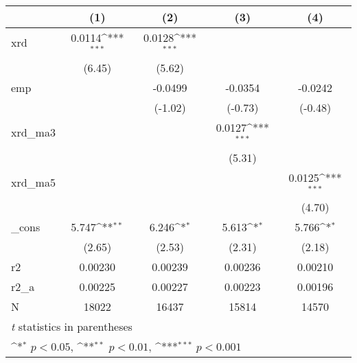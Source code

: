 {
\def\sym#1{\ifmmode^{#1}\else\(^{#1}\)\fi}
\begin{tabular}{l*{4}{c}}
\hline\hline
            &\multicolumn{1}{c}{(1)}         &\multicolumn{1}{c}{(2)}         &\multicolumn{1}{c}{(3)}         &\multicolumn{1}{c}{(4)}         \\
\hline
xrd         &      0.0114\sym{***}&      0.0128\sym{***}&                     &                     \\
            &      (6.45)         &      (5.62)         &                     &                     \\
[1em]
emp         &                     &     -0.0499         &     -0.0354         &     -0.0242         \\
            &                     &     (-1.02)         &     (-0.73)         &     (-0.48)         \\
[1em]
xrd\_ma3     &                     &                     &      0.0127\sym{***}&                     \\
            &                     &                     &      (5.31)         &                     \\
[1em]
xrd\_ma5     &                     &                     &                     &      0.0125\sym{***}\\
            &                     &                     &                     &      (4.70)         \\
[1em]
\_cons      &       5.747\sym{**} &       6.246\sym{*}  &       5.613\sym{*}  &       5.766\sym{*}  \\
            &      (2.65)         &      (2.53)         &      (2.31)         &      (2.18)         \\
\hline
r2          &     0.00230         &     0.00239         &     0.00236         &     0.00210         \\
r2\_a        &     0.00225         &     0.00227         &     0.00223         &     0.00196         \\
N           &       18022         &       16437         &       15814         &       14570         \\
\hline\hline
\multicolumn{5}{l}{\footnotesize \textit{t} statistics in parentheses}\\
\multicolumn{5}{l}{\footnotesize \sym{*} \(p<0.05\), \sym{**} \(p<0.01\), \sym{***} \(p<0.001\)}\\
\end{tabular}
}
